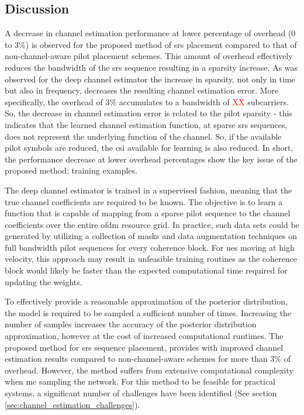 \subsection{Discussion}
A decrease in channel estimation performance at lower percentage of overhead ($0$ to $3\%$) is observed for the proposed method of \gls{srs} placement compared to that of non-channel-aware pilot placement schemes. This amount of overhead effectively reduces the bandwidth of the \gls{srs} sequence resulting in a sparsity increase. As was observed for the deep channel estimator the increase in sparsity, not only in time but also in frequency, decreases the resulting channel estimation error. More specifically, the overhead of $3\%$ accumulates to a bandwidth of \textcolor{red}{XX} subcarriers. So, the decrease in channel estimation error is related to the pilot sparsity - this indicates that the learned channel estimation function, at sparse \gls{srs} sequences, does not represent the underlying function of the channel. So, if the available pilot symbols are reduced, the \gls{csi} available for learning is also reduced. In short, the performance decrease at lower overhead percentages show the key issue of the proposed method; training examples.

The deep channel estimator is trained in a supervised fashion, meaning that the true channel coefficients are required to be known. The objective is to learn a function that is capable of mapping from a sparse pilot sequence to the channel coefficients over the entire \gls{ofdm} resource grid. In practice, such data sets could be generated by utilizing a collection of masks and data augmentation techniques on full bandwidth pilot sequences for every coherence block. For \glspl{ue} moving at high velocity, this approach may result in unfeasible training routines as the coherence block would likely be faster than the expected computational time required for updating the weights.

To effectively provide a reasonable approximation of the posterior distribution, the model is required to be sampled a sufficient number of times. Increasing the number of samples increases the accuracy of the posterior distribution approximation, however at the cost of increased computational runtimes. The proposed method for \gls{srs} sequence placement, provides with improved channel estimation results compared to non-channel-aware schemes for more than $3\%$ of overhead. However, the method suffers from extensive computational complexity when \gls{mc} sampling the network. For this method to be feasible for practical systems, a significant number of challenges have been identified (See section \ref{sec:channel_estimation_challenges}). 

